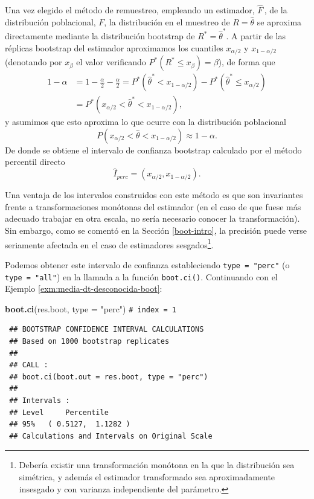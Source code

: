 \documentclass[
  spanish,
  10pt,
]{book}
\newenvironment{Shaded}{\begin{snugshade}}{\end{snugshade}}
\newcommand{\AttributeTok}[1]{\textcolor[rgb]{0.13,0.29,0.53}{#1}}
\newcommand{\CommentTok}[1]{\textcolor[rgb]{0.56,0.35,0.01}{\textit{#1}}}
\newcommand{\FunctionTok}[1]{\textcolor[rgb]{0.13,0.29,0.53}{\textbf{#1}}}
\newcommand{\NormalTok}[1]{#1}
\newcommand{\StringTok}[1]{\textcolor[rgb]{0.31,0.60,0.02}{#1}}
\theoremstyle{break}
\theoremstyle{nonumberplain}
\renewcommand{\CommentTok}[1]{\textcolor[rgb]{0.41,0.41,0.41}{\texttt{#1}}}
\let\oldfootnote\footnote
\renewcommand\footnote[1]{\oldfootnote{\hspace{2mm}#1}}
\begin{document}
Una vez elegido el método de remuestreo, empleando un estimador, \(\hat{F}\,\), de la
distribución poblacional, \(F\), la distribución en el muestreo de \(R = \hat{\theta}\) se aproxima directamente mediante la distribución bootstrap de \(R^{\ast}= \hat{\theta}^{\ast}\).
A partir de las réplicas bootstrap del estimador aproximamos los cuantiles \(x_{\alpha /2}\) y \(x_{1-\alpha /2}\) (denotando por \(x_{\beta }\) el valor verificando \(P^{\ast}\left( R^{\ast }\leq x_{\beta } \right) =\beta\)), de forma que
\[\begin{aligned}
1-\alpha &= 1-\frac{\alpha }{2}-\frac{\alpha }{2}
= P^{\ast}\left( \hat{\theta}^{\ast}<x_{1-\alpha /2} \right) - P^{\ast}\left( \hat{\theta}^{\ast}\leq x_{\alpha /2} \right) \\
&= P^{\ast}\left( x_{\alpha /2}<\hat{\theta}^{\ast}<x_{1-\alpha /2} \right),
\end{aligned}\]
y asumimos que esto aproxima lo que ocurre con la distribución poblacional
\[P\left( x_{\alpha /2} < \hat{\theta} < x_{1-\alpha /2} \right) \approx 1-\alpha.\]
De donde se obtiene el intervalo de confianza bootstrap calculado
por el método percentil directo
\[\hat{I}_{perc}=\left( x_{\alpha /2}, x_{1-\alpha /2}  \right).\]

Una ventaja de los intervalos construidos con este método es que son invariantes frente a transformaciones monótonas del estimador (en el caso de que fuese más adecuado trabajar en otra escala, no sería necesario conocer la transformación).
Sin embargo, como se comentó en la Sección \ref{boot-intro}, la precisión puede verse seriamente afectada en el caso de estimadores sesgados\footnote{Debería existir una transformación monótona en la que la distribución sea simétrica, y además el estimador transformado sea aproximadamente insesgado y con varianza independiente del parámetro.}.

Podemos obtener este intervalo de confianza estableciendo \texttt{type\ =\ "perc"} (o \texttt{type\ =\ "all"}) en la llamada a la función \texttt{boot.ci()}.
Continuando con el Ejemplo \ref{exm:media-dt-desconocida-boot}:

\begin{Shaded}
\begin{Highlighting}[]
\FunctionTok{boot.ci}\NormalTok{(res.boot, }\AttributeTok{type =} \StringTok{"perc"}\NormalTok{) }\CommentTok{\# index = 1}
\end{Highlighting}
\end{Shaded}

\begin{verbatim}
 ## BOOTSTRAP CONFIDENCE INTERVAL CALCULATIONS
 ## Based on 1000 bootstrap replicates
 ## 
 ## CALL : 
 ## boot.ci(boot.out = res.boot, type = "perc")
 ## 
 ## Intervals : 
 ## Level     Percentile     
 ## 95%   ( 0.5127,  1.1282 )  
 ## Calculations and Intervals on Original Scale
\end{verbatim}
\end{document}
